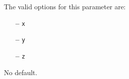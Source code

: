 The valid options for this parameter are:
\begin{itemize}
\item[{\bf --}] \verb#x#
\item[{\bf --}] \verb#y#
\item[{\bf --}] \verb#z# 
\end{itemize}

No default.


%

%
%
%
%
%
%
%
%
%
%
%
%




